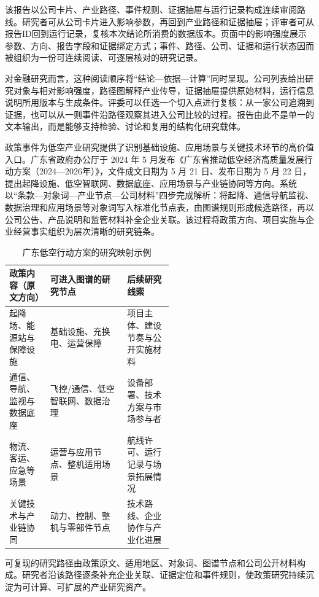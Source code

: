 该报告以公司卡片、产业路径、事件规则、证据抽屉与运行记录构成连续审阅路线。研究者可从公司卡片进入影响参数，再回到产业路径和证据抽屉；评审者可从报告ID回到运行记录，复核本次结论所消费的数据版本。页面中的影响强度展示参数、方向、报告字段和证据绑定方式；事件、路径、公司、证据和运行状态因而被组织为一份可连续阅读、可逐层核对的研究记录。

对金融研究而言，这种阅读顺序将“结论—依据—计算”同时呈现。公司列表给出研究对象与相对影响强度，路径图解释产业传导，证据抽屉提供原始材料，运行信息说明所用版本与生成条件。评委可以任选一个切入点进行复核：从一家公司追溯到证据，也可以从一则事件沿路径观察其进入公司比较的过程。报告由此不是单一的文本输出，而是能够支持检验、讨论和复用的结构化研究载体。


政策事件为低空产业研究提供了识别基础设施、应用场景与关键技术环节的高价值入口。广东省政府办公厅于 2024 年 5 月发布《广东省推动低空经济高质量发展行动方案（2024—2026年）》，文件成文日期为 5 月 21 日、发布日期为 5 月 22 日\cite{wty-gd-plan}，提出起降设施、低空智联网、数据底座、应用场景与产业链协同等方向。系统以“条款—对象词—产业节点—公司材料”四步完成解析：将起降、通信导航监视、数据治理和应用场景等对象词写入标准化节点表，由图谱规则形成候选路径，再以公司公告、产品说明和监管材料补全企业关联。该过程将政策方向、项目实施与企业经营事实组织为层次清晰的研究链条。

\begin{table}[!htbp]
\centering
\caption{广东低空行动方案的研究映射示例}
\label{tab:wty-policy-case}
\small
\begin{tabularx}{\linewidth}{p{0.25\linewidth}X p{0.28\linewidth}}
\toprule
政策内容（原文方向） & 可进入图谱的研究节点 & 后续研究线索 \\
\midrule
起降场、能源站与保障设施 & 基础设施、充换电、运营保障 & 项目主体、建设节奏与公开实施材料 \\
通信、导航、监视与数据底座 & 飞控/通信、低空智联网、数据治理 & 设备部署、技术方案与市场参与者 \\
物流、客运、应急等场景 & 运营与应用节点、整机适用场景 & 航线许可、运行记录与场景拓展情况 \\
关键技术与产业链协同 & 动力、控制、整机与零部件节点 & 技术路线、企业协作与产业化进展 \\
\bottomrule
\end{tabularx}
\end{table}

可复现的研究路径由政策原文、适用地区、对象词、图谱节点和公司公开材料构成。研究者沿该路径逐条补充企业关联、证据定位和事件规则，使政策研究持续沉淀为可计算、可扩展的产业研究资产。


